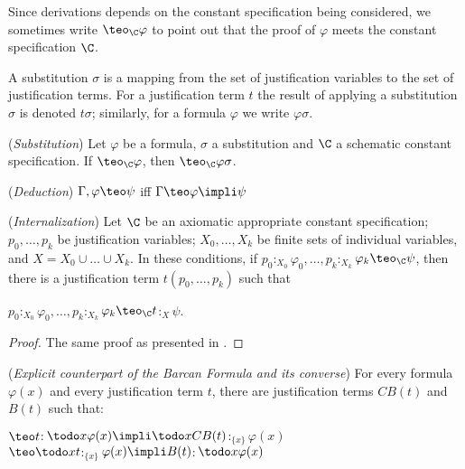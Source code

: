 \qquad Since derivations depends on the constant specification being considered, we sometimes write $\teo_{\C} \varphi$ to point out that the proof of $\varphi$ meets the constant specification $\C$.

\begin{defn}
A substitution $\sigma$ is a mapping from the set of justification variables to the set of justification terms. For a justification term $t$ the result of applying a substitution $\sigma$ is denoted $t\sigma$; similarly, for a formula $\varphi$ we write $\varphi\sigma$.
\end{defn}


\begin{lema}
(\textit{Substitution}) Let $\varphi$ be a formula, $\sigma$ a substitution and $\C$ a schematic constant specification. If  $\teo_{\C} \varphi$, then  $\teo_{\C} \varphi\sigma$.
\end{lema}

\begin{lema}
(\textit{Deduction})  $\Gamma,\varphi \teo \psi$ iff  $\Gamma \teo \varphi \impli \psi$
\end{lema}

\begin{teor}
	(\textit{Internalization}) Let $\C$ be an axiomatic appropriate constant specification; $p_{0}, \dots, p_{k}$ be justification variables; $X_{0}, \dots, X_{k}$ be finite sets of individual variables, and $X =X_{0} \cup \dots \cup X_{k}$. In these conditions, if  $p_{0}$$:_{X_{0}}$$\varphi_{0}, \dots, p_{k}$$:_{X_{k}}$$\varphi_{k} \teo_{\C} \psi$, then there is a justification term $t(p_{0}, \dots, p_{k})$ such that 
	
	\begin{center}
		$p_{0}$$:_{X_{0}}$$\varphi_{0}, \dots, 
		p_{k}$$:_{X_{k}}$$\varphi_{k} \teo_{\C} t$$:_{X}$$\psi$.
	\end{center}
	
\end{teor}

\begin{proof}
The same proof as presented in \cite[p. 7]{Artemov11}.
\end{proof}

\pagebreak


\begin{pro}
(\textit{Explicit counterpart of the Barcan Formula and its converse}) For every formula $\varphi(x)$ and every justification term $t$, there are justification terms $CB(t)$ and $B(t)$ such that: 
\begin{center}
$\teo t$$:$$\todo x \varphi(x) \impli \todo x CB(t)$$:_{\{x\}}$$\varphi(x)$\\

$\teo \todo x t$$:_{\{x\}}$$\varphi(x) \impli B(t)$$:$$\todo x \varphi(x)$
\end{center}
\end{pro}



